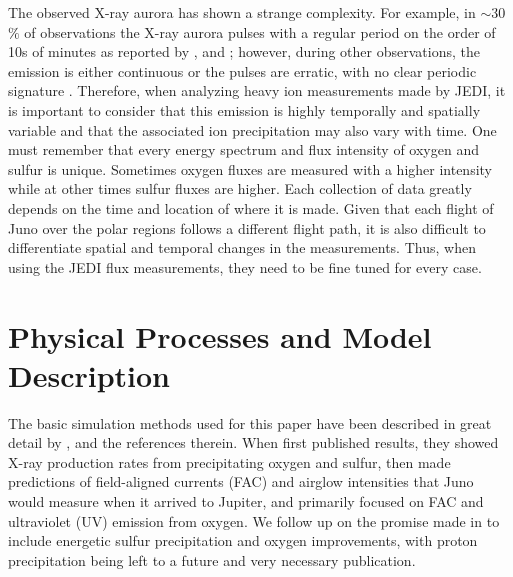 \documentclass[draft]{agujournal2018}
\begin{document}
The observed X-ray aurora has shown a strange complexity.
For example, in $\sim$30$\%$ of observations the X-ray aurora pulses with a regular period on the order of 10s of minutes as reported by \citet{dunn2016,dunn2017,gladstone2002}, and \citet{jackman2018}; however, during other observations, the emission is either continuous or the pulses are erratic, with no clear periodic signature \citep{elsner2005,branduardi2007}.
Therefore, when analyzing heavy ion measurements made by JEDI, it is important to consider that this emission is highly temporally and spatially variable and that the associated ion precipitation may also vary with time.
One must remember that every energy spectrum and flux intensity of oxygen and sulfur is unique.
Sometimes oxygen fluxes are measured with a higher intensity while at other times sulfur fluxes are higher.
Each collection of data greatly depends on the time and location of where it is made.
Given that each flight of Juno over the polar regions follows a different flight path, it is also difficult to differentiate spatial and temporal changes in the measurements.
Thus, when using the JEDI flux measurements, they need to be fine tuned for every case.

\section{Physical Processes and Model Description}

The basic simulation methods used for this paper have been described in great detail by \citet{ozak2010,ozak2013,houston2018}, and the references therein.
When \citet{ozak2010} first published results, they showed X-ray production rates from precipitating oxygen and sulfur, then \citet{ozak2013} made predictions of field-aligned currents (FAC) and airglow intensities that Juno would measure when it arrived to Jupiter, and \citet{houston2018} primarily focused on FAC and ultraviolet (UV) emission from oxygen.
We follow up on the promise made in \citet{houston2018} to include energetic sulfur precipitation and oxygen improvements, with proton precipitation being left to a future and very necessary publication.
\end{document}
